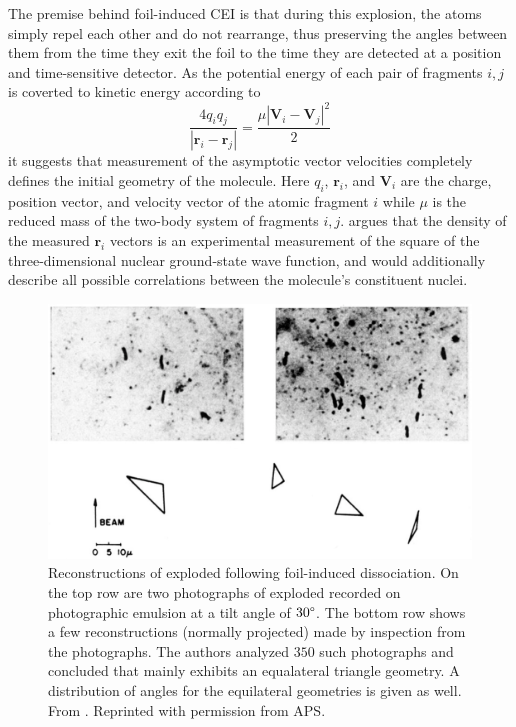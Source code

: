 The premise behind foil-induced CEI is that during this explosion, the atoms simply repel each other and do not rearrange, thus preserving the angles between them from the time they exit the foil to the time they are detected at a position and time-sensitive detector. As the potential energy of each pair of fragments $i,j$ is coverted to kinetic energy according to
\begin{equation} \label{eq:foilCEI}
\frac{4q_i q_j}{|\mathbf{r}_i - \mathbf{r}_j|} = \frac{\mu|\mathbf{V}_i - \mathbf{V}_j|^2}{2}
\end{equation}
it suggests that measurement of the asymptotic vector velocities completely defines the initial geometry of the molecule. Here $q_i$, $\mathbf{r}_i$, and $\mathbf{V}_i$ are the charge, position vector, and velocity vector of the atomic fragment $i$ while $\mu$ is the reduced mass of the two-body system of fragments $i,j$. \citet{Vager89} argues that the density of the measured $\mathbf{r}_i$ vectors is an experimental measurement of the square of the three-dimensional nuclear ground-state wave function, and would additionally describe all possible correlations between the molecule's constituent nuclei.

\begin{figure}
  \centering
  \includegraphics[width=\textwidth]{gfx/HydrogenTrimerReconstruction}
  \caption[Reconstructions of exploded  following foil-induced dissociation.]
  {Reconstructions of exploded  following foil-induced dissociation. On the top row are two photographs of exploded  recorded on photographic emulsion at a tilt angle of $30\degree$. The bottom row shows a few reconstructions (normally projected) made by inspection from the photographs. The authors analyzed $350$ such photographs and concluded that  mainly exhibits an equalateral triangle geometry. A distribution of angles for the equilateral geometries is given as well. From \citet{Gaillard78}. Reprinted with permission from APS.}
  \label{fig:hydrogenTrimer}
\end{figure}

